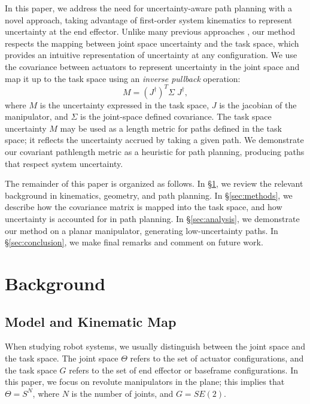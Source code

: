 \documentclass[10pt,conference]{ieeeconf}
\begin{document}
In this paper, we address the need for uncertainty-aware path planning with a novel approach, taking advantage of first-order system kinematics to represent uncertainty at the end effector.
Unlike many previous approaches \cite{previous work?}, our method respects the mapping between joint space uncertainty and the task space, which provides an intuitive representation of uncertainty at any configuration.
We use the covariance between actuators to represent uncertainty in the joint space and map it up to the task space using an \textit{inverse pullback} operation:
\begin{equation}
	M = \left(J^\dagger\right)^T \Sigma \; J^\dagger,
\end{equation}
where $M$ is the uncertainty expressed in the task space, $J$ is the jacobian of the manipulator, and $\Sigma$ is the joint-space defined covariance.
The task space uncertainty $M$ may be used as a length metric for paths defined in the task space; it reflects the uncertainty accrued by taking a given path.
We demonstrate our covariant pathlength metric as a heuristic for path planning, producing paths that respect system uncertainty.

The remainder of this paper is organized as follows.
In \S\ref{sec:background}, we review the relevant background in kinematics, geometry, and path planning.
In \S\ref{sec:methods}, we describe how the covariance matrix is mapped into the task space, and how uncertainty is accounted for in path planning.
In \S\ref{sec:analysis}, we demonstrate our method on a planar manipulator, generating low-uncertainty paths.
In \S\ref{sec:conclusion}, we make final remarks and comment on future work.

\section{Background}\label{sec:background}
\subsection{Model and Kinematic Map}
When studying robot systems, we usually distinguish between the joint space and the task space.
The joint space $\Theta$ refers to the set of actuator configurations, and the task space $G$ refers to the set of end effector or baseframe configurations.
In this paper, we focus on revolute manipulators in the plane; this implies that $\Theta = S^N$, where $N$ is the number of joints, and $G = SE(2)$.
\end{document}
